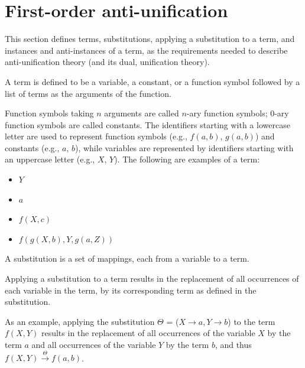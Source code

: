 \section{First-order anti-unification}   \label{AU}

This section defines terms, substitutions, applying a substitution to a term, and instances and anti-instances of a term, as the requirements needed  to describe anti-unification theory (and its dual, unification theory).

\begin{defn}[Term]\label{def:term}
A term is defined to be a variable, a constant, or a function symbol followed by a list of terms as the arguments of the function.
\end{defn}

Function symbols taking $n$ arguments are called $n$-ary function symbols; 0-ary function symbols are called constants. The identifiers starting with a lowercase letter are used to represent function symbols (e.g., $f(a,b)$, $g(a,b)$) and constants (e.g., $a$, $b$), while variables are represented by identifiers starting with an uppercase letter (e.g., $X$, $Y$). The following are examples of a term:
\begin{itemize} [leftmargin=0.7in]
\item $Y$
\item $a$
\item $f(X, c)$
\item $f(g(X, b),Y, g(a, Z))$
\end{itemize}
\begin{defn}[Substitution]\label{def:substitution}
A substitution is a set of mappings, each from a variable to a term.
\end{defn}

\begin{defn}\label{def:substitution}
Applying a substitution to a term results in the replacement of all occurrences of each variable in the term, by its corresponding term as defined in the substitution.
\end{defn}

As an example, applying the substitution $\Theta$ = ({$X \rightarrow a, Y \rightarrow b $})
to the term $f(X,Y)$ results in the replacement of all occurrences of the variable $X$ by the term $a$ and all occurrences of the variable $Y$ by the term $b$, and thus $f(X,Y)\xrightarrow{\Theta} f(a,b)$.

